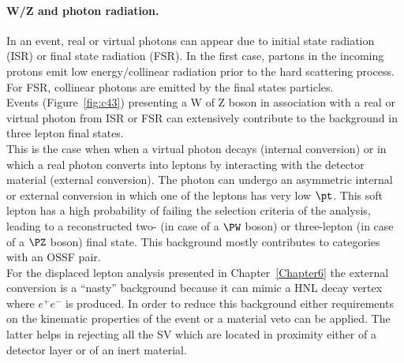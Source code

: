 \paragraph{W/Z and photon radiation.}\label{sec:c4photon}
In an event, real or virtual photons can appear due to initial state
radiation (ISR) or final state radiation (FSR). In the first case,
partons in the incoming protons emit low energy/collinear radiation
prior to the hard scattering process. For FSR, collinear photons are emitted by
the final states particles.\\
Events (Figure~\ref{fig:c43}) presenting a W of Z boson in association with a real or virtual
photon from ISR or FSR can extensively contribute to
the background in three lepton final states.\\
This is the case when when a virtual photon decays (internal
conversion) or in which a real photon converts into leptons by interacting with the detector material
(external conversion). The photon can undergo an
asymmetric internal or external conversion in which one of the leptons
has very low $\pt$. This soft lepton has a high probability of failing
the selection criteria of the analysis, leading to a reconstructed
two- (in case of a $\PW$ boson) or three-lepton (in case of a $\PZ$
boson) final state. This background mostly contributes to categories
with an OSSF pair.\\
For the displaced lepton analysis presented in Chapter~\ref{Chapter6}
the external conversion is a ``nasty'' background because it can mimic
a HNL decay vertex where $e^{+}e^{-}$ is produced. In order
to reduce this background either requirements on the kinematic
properties of the event or a material veto can be applied. The latter
helps in rejecting all the SV
which are located in proximity either of a detector layer or of an inert material.

